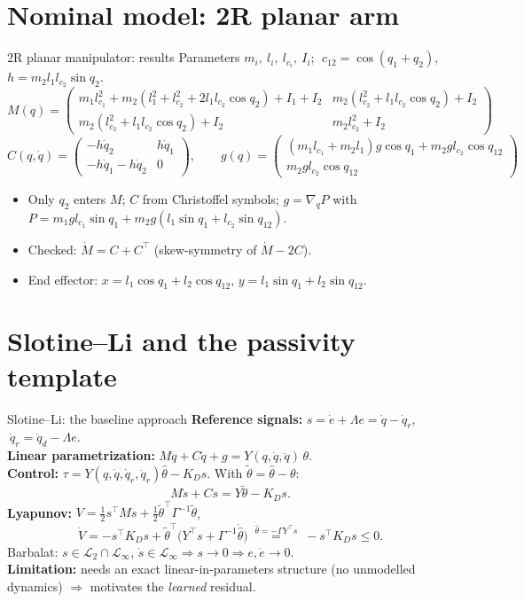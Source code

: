 \documentclass[aspectratio=169,10pt]{beamer}
\newcommand{\dq}{\dot q}
\begin{document}
\section{Nominal model: 2R planar arm}
\begin{frame}{2R planar manipulator: results}
Parameters $m_i,\ l_i,\ l_{c_i},\ I_i$; $\;c_{12}=\cos(q_1+q_2)$, $h=m_2l_1l_{c_2}\sin q_2$.
\[
M(q)=\begin{pmatrix}
m_1l_{c_1}^2+m_2(l_1^2+l_{c_2}^2+2l_1l_{c_2}\cos q_2)+I_1+I_2 & m_2(l_{c_2}^2+l_1l_{c_2}\cos q_2)+I_2\\
m_2(l_{c_2}^2+l_1l_{c_2}\cos q_2)+I_2 & m_2l_{c_2}^2+I_2
\end{pmatrix}
\]
\[
C(q,\dq)=\begin{pmatrix}-h\dq_2 & h\dq_1\\ -h\dq_1-h\dq_2 & 0\end{pmatrix},\qquad
g(q)=\begin{pmatrix}(m_1l_{c_1}+m_2l_1)g\cos q_1+m_2gl_{c_2}\cos q_{12}\\ m_2gl_{c_2}\cos q_{12}\end{pmatrix}
\]
\small
\begin{itemize}
\item Only $q_2$ enters $M$; $C$ from Christoffel symbols; $g=\nabla_q P$ with $P=m_1gl_{c_1}\sin q_1+m_2g(l_1\sin q_1+l_{c_2}\sin q_{12})$.
\item Checked: $\dot M=C+C^\top$ (skew-symmetry of $\dot M-2C$).
\item End effector: $x=l_1\cos q_1+l_2\cos q_{12}$, $y=l_1\sin q_1+l_2\sin q_{12}$.
\end{itemize}
\end{frame}

\section{Slotine--Li and the passivity template}
\begin{frame}{Slotine--Li: the baseline approach}
\textbf{Reference signals:} $s=\dot e+\Lambda e=\dq-\dq_r$, $\ \dq_r=\dq_d-\Lambda e$.\\[2mm]
\textbf{Linear parametrization:} $M\ddot q+C\dq+g=Y(q,\dq,\ddot q)\,\theta$.\\[2mm]
\textbf{Control:} $\tau=Y(q,\dq,\dq_r,\ddot q_r )\hat\theta-K_Ds$. With $\tilde\theta=\hat\theta-\theta$:
\[
M\dot s+Cs=Y\tilde\theta-K_Ds .
\]
\textbf{Lyapunov:} $V=\tfrac12 s^\top Ms+\tfrac12\tilde\theta^\top\Gamma^{-1}\tilde\theta$,
\[
\dot V=-s^\top K_Ds+\tilde\theta^\top\!\big(Y^\top s+\Gamma^{-1}\dot{\hat\theta}\big)
\;\overset{\dot{\hat\theta}=-\Gamma Y^\top s}{=}\;-s^\top K_Ds\le0 .
\]
Barbalat: $s\in\mathcal L_2\cap\mathcal L_\infty$, $\dot s\in\mathcal L_\infty\Rightarrow s\to0\Rightarrow e,\dot e\to0$.\\[1mm]
\textbf{Limitation:} needs an exact linear-in-parameters structure (no unmodelled dynamics) $\Rightarrow$ motivates the \emph{learned} residual.
\end{frame}
\end{document}
